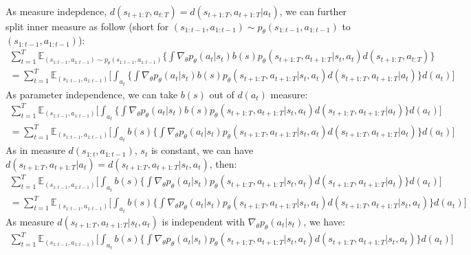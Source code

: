 \documentclass[12pt]{article}
\begin{document}
\begin{enumerate} [label=(\alph*)]
\begin{enumerate}[label=(\alph*)]
\begin{multline}
\end{multline}
 As measure indepdence, $d(s_{t+1:T}, a_{t:T}) = d(s_{t+1:T}, a_{t+1:T} | a_t)$, we can further split inner measure as follow (short for $(s_{1:t-1},a_{1:t-1}) \sim p_\theta(s_{1:t-1},a_{1:t-1})$ to $(s_{1:t-1},a_{1:t-1}) $):
  \begin{multline}
 \sum_{t=1}^T \mathbb{E}_{(s_{1:t-1},a_{1:t-1}) \sim p_\theta(s_{1:t-1},a_{1:t-1})} \lbrace \int \nabla_\theta p_\theta(a_t|s_t) b(s) p_\theta(s_{t+1:T}, a_{t+1:T} | s_t, a_t ) d(s_{t+1:T}, a_{t:T})\rbrace \\
 = \sum_{t=1}^T \mathbb{E}_{(s_{1:t-1},a_{1:t-1}) } \lbrack \int_{a_t} \lbrace \int \nabla_\theta p_\theta(a_t|s_t) b(s) p_\theta(s_{t+1:T}, a_{t+1:T} | s_t, a_t ) d(s_{t+1:T}, a_{t+1:T} | a_t)\rbrace d(a_t)\rbrack
 \end{multline}
As parameter independence, we can take $b(s)$ out of $d(a_t)$ measure:
 \begin{multline}
 \sum_{t=1}^T \mathbb{E}_{(s_{1:t-1},a_{1:t-1}) } \lbrack \int_{a_t} \lbrace \int \nabla_\theta p_\theta(a_t|s_t) b(s) p_\theta(s_{t+1:T}, a_{t+1:T} | s_t, a_t ) d(s_{t+1:T}, a_{t+1:T} | a_t)\rbrace d(a_t)\rbrack \\
= \sum_{t=1}^T \mathbb{E}_{(s_{1:t-1},a_{1:t-1}) } \lbrack \int_{a_t}  b(s) \lbrace \int \nabla_\theta p_\theta(a_t|s_t)  p_\theta(s_{t+1:T}, a_{t+1:T} | s_t, a_t ) d(s_{t+1:T}, a_{t+1:T} | a_t)\rbrace d(a_t)\rbrack
\end{multline}
As in measure $d(s_{1:t}, a_{1:t-1})$, $s_t$ is constant, we can have $d(s_{t+1:T}, a_{t+1:T} | a_t) = d(s_{t+1:T}, a_{t+1:T} | s_t, a_t) $, then:
 \begin{multline}
\sum_{t=1}^T \mathbb{E}_{(s_{1:t-1},a_{1:t-1}) } \lbrack \int_{a_t}  b(s) \lbrace \int \nabla_\theta p_\theta(a_t|s_t)  p_\theta(s_{t+1:T}, a_{t+1:T} | s_t, a_t ) d(s_{t+1:T}, a_{t+1:T} | a_t)\rbrace d(a_t)\rbrack \\
= \sum_{t=1}^T \mathbb{E}_{(s_{1:t-1},a_{1:t-1}) } \lbrack \int_{a_t}  b(s) \lbrace \int \nabla_\theta p_\theta(a_t|s_t)  p_\theta(s_{t+1:T}, a_{t+1:T} | s_t, a_t ) d(s_{t+1:T}, a_{t+1:T} | s_t, a_t)\rbrace d(a_t)\rbrack
\end{multline}
As measure $d(s_{t+1:T}, a_{t+1:T} | s_t, a_t) $ is independent with $\nabla_\theta p_\theta(a_t|s_t)$, we have:
 \begin{multline}
\sum_{t=1}^T \mathbb{E}_{(s_{1:t-1},a_{1:t-1}) } \lbrack \int_{a_t}  b(s) \lbrace \int \nabla_\theta p_\theta(a_t|s_t)  p_\theta(s_{t+1:T}, a_{t+1:T} | s_t, a_t ) d(s_{t+1:T}, a_{t+1:T} | s_t, a_t)\rbrace d(a_t)\rbrack \\

\end{multline}
\end{enumerate}
\end{enumerate}
\end{document}
